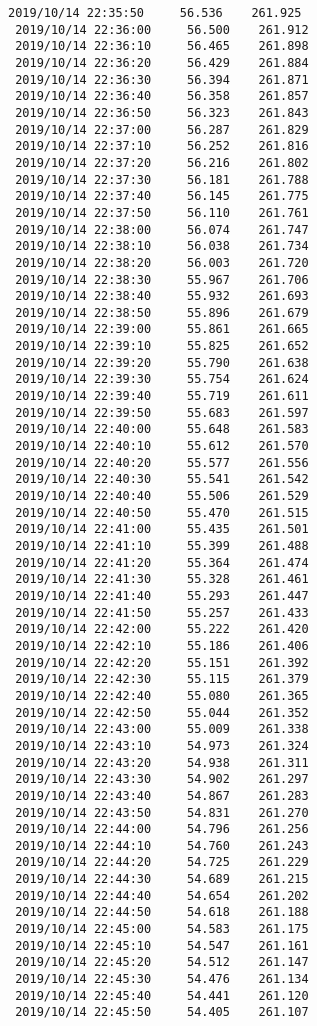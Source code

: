\documentclass[11pt]{article}
\begin{document}
\begin{Verbatim}[commandchars=\\\{\}]
 2019/10/14 22:35:50     56.536    261.925
 2019/10/14 22:36:00     56.500    261.912
 2019/10/14 22:36:10     56.465    261.898
 2019/10/14 22:36:20     56.429    261.884
 2019/10/14 22:36:30     56.394    261.871
 2019/10/14 22:36:40     56.358    261.857
 2019/10/14 22:36:50     56.323    261.843
 2019/10/14 22:37:00     56.287    261.829
 2019/10/14 22:37:10     56.252    261.816
 2019/10/14 22:37:20     56.216    261.802
 2019/10/14 22:37:30     56.181    261.788
 2019/10/14 22:37:40     56.145    261.775
 2019/10/14 22:37:50     56.110    261.761
 2019/10/14 22:38:00     56.074    261.747
 2019/10/14 22:38:10     56.038    261.734
 2019/10/14 22:38:20     56.003    261.720
 2019/10/14 22:38:30     55.967    261.706
 2019/10/14 22:38:40     55.932    261.693
 2019/10/14 22:38:50     55.896    261.679
 2019/10/14 22:39:00     55.861    261.665
 2019/10/14 22:39:10     55.825    261.652
 2019/10/14 22:39:20     55.790    261.638
 2019/10/14 22:39:30     55.754    261.624
 2019/10/14 22:39:40     55.719    261.611
 2019/10/14 22:39:50     55.683    261.597
 2019/10/14 22:40:00     55.648    261.583
 2019/10/14 22:40:10     55.612    261.570
 2019/10/14 22:40:20     55.577    261.556
 2019/10/14 22:40:30     55.541    261.542
 2019/10/14 22:40:40     55.506    261.529
 2019/10/14 22:40:50     55.470    261.515
 2019/10/14 22:41:00     55.435    261.501
 2019/10/14 22:41:10     55.399    261.488
 2019/10/14 22:41:20     55.364    261.474
 2019/10/14 22:41:30     55.328    261.461
 2019/10/14 22:41:40     55.293    261.447
 2019/10/14 22:41:50     55.257    261.433
 2019/10/14 22:42:00     55.222    261.420
 2019/10/14 22:42:10     55.186    261.406
 2019/10/14 22:42:20     55.151    261.392
 2019/10/14 22:42:30     55.115    261.379
 2019/10/14 22:42:40     55.080    261.365
 2019/10/14 22:42:50     55.044    261.352
 2019/10/14 22:43:00     55.009    261.338
 2019/10/14 22:43:10     54.973    261.324
 2019/10/14 22:43:20     54.938    261.311
 2019/10/14 22:43:30     54.902    261.297
 2019/10/14 22:43:40     54.867    261.283
 2019/10/14 22:43:50     54.831    261.270
 2019/10/14 22:44:00     54.796    261.256
 2019/10/14 22:44:10     54.760    261.243
 2019/10/14 22:44:20     54.725    261.229
 2019/10/14 22:44:30     54.689    261.215
 2019/10/14 22:44:40     54.654    261.202
 2019/10/14 22:44:50     54.618    261.188
 2019/10/14 22:45:00     54.583    261.175
 2019/10/14 22:45:10     54.547    261.161
 2019/10/14 22:45:20     54.512    261.147
 2019/10/14 22:45:30     54.476    261.134
 2019/10/14 22:45:40     54.441    261.120
 2019/10/14 22:45:50     54.405    261.107

\end{Verbatim}
\end{document}
